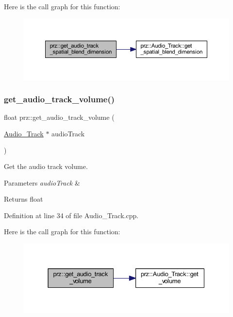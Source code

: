 Here is the call graph for this function\+:
\nopagebreak
\begin{figure}[H]
\begin{center}
\leavevmode
\includegraphics[width=350pt]{namespaceprz_a4fb782ac49bc3d6a8d5ef62f0d529b29_cgraph}
\end{center}
\end{figure}
\mbox{\label{namespaceprz_ac010ab2ba32ea1a6777bdf865aa2dcd5}} 
\subsubsection{\texorpdfstring{get\_audio\_track\_volume()}{get\_audio\_track\_volume()}}
{\footnotesize\ttfamily float prz\+::get\+\_\+audio\+\_\+track\+\_\+volume (\begin{DoxyParamCaption}\item[{\mbox{\hyperlink{classprz_1_1_audio___track}{Audio\+\_\+\+Track}} $\ast$}]{audio\+Track }\end{DoxyParamCaption})}



Get the audio track volume. 


\begin{DoxyParams}{Parameters}
{\em audio\+Track} & \\
\hline
\end{DoxyParams}
\begin{DoxyReturn}{Returns}
float 
\end{DoxyReturn}


Definition at line 34 of file Audio\+\_\+\+Track.\+cpp.

Here is the call graph for this function\+:
\nopagebreak
\begin{figure}[H]
\begin{center}
\leavevmode
\includegraphics[width=331pt]{namespaceprz_ac010ab2ba32ea1a6777bdf865aa2dcd5_cgraph}
\end{center}
\end{figure}
\mbox{\label{namespaceprz_a1e7f643937e9d287b0ee7b629861e34c}} 
